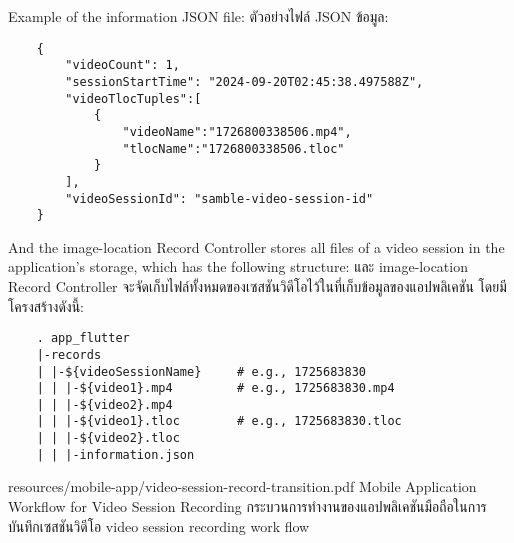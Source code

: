 \ifenglish
Example of the information JSON file:
\else
ตัวอย่างไฟล์ JSON ข้อมูล:
\fi
\begin{lstlisting}
    {
        "videoCount": 1,
        "sessionStartTime": "2024-09-20T02:45:38.497588Z",
        "videoTlocTuples":[
            {
                "videoName":"1726800338506.mp4",
                "tlocName":"1726800338506.tloc"
            }
        ],
        "videoSessionId": "samble-video-session-id"
    }
\end{lstlisting}

\ifenglish
And the image-location Record Controller stores all files of a video session in the application's storage, which has the following structure:
\else
และ image-location Record Controller จะจัดเก็บไฟล์ทั้งหมดของเซสชันวิดีโอไว้ในที่เก็บข้อมูลของแอปพลิเคชัน โดยมีโครงสร้างดังนี้:
\fi

\begin{lstlisting}
    . app_flutter
    |-records
    | |-${videoSessionName}     # e.g., 1725683830
    | | |-${video1}.mp4         # e.g., 1725683830.mp4
    | | |-${video2}.mp4
    | | |-${video1}.tloc        # e.g., 1725683830.tloc
    | | |-${video2}.tloc
    | | |-information.json
\end{lstlisting}

\insertPDFfigure
{resources/mobile-app/video-session-record-transition.pdf}
{\ifenglish Mobile Application Workflow for Video Session Recording \else กระบวนการทำงานของแอปพลิเคชันมือถือในการบันทึกเซสชันวิดีโอ \fi}
{video session recording work flow}
